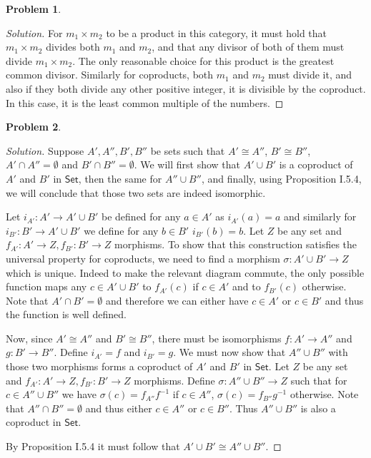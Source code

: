 \documentclass{article}
\theoremstyle{definition}
\newtheorem{problem-internal}{Problem}[subsection]
\newenvironment{problem}{
	\medskip
	\begin{problem-internal}
	}{
\end{problem-internal}
}
\newenvironment{solution}{
	\begin{proof}[Solution]
		\vspace{-8px}
		\setlength{\parskip}{4px}
		\setlength{\parindent}{0px}
	}{
\end{proof}
}
\newcommand{\Cset}{\mathsf{Set}}
\begin{document}
\begin{problem}
\end{problem}

\begin{solution}
	For $m_1 \times m_2$ to be a product in this category, it must hold that $m_1 \times m_2$ divides both $m_1$ and $m_2$, and that any divisor of both of them must divide $m_1 \times m_2$. The only reasonable choice for this product is the greatest common divisor. Similarly for coproducts, both $m_1$ and $m_2$ must divide it, and also if they both divide any other positive integer, it is divisible by the coproduct. In this case, it is the least common multiple of the numbers.
\end{solution}

\begin{problem}
\end{problem}

\begin{solution}
	Suppose $A', A'', B', B''$ be sets such that $A' \cong A''$, $B' \cong B''$, $A' \cap A'' = \emptyset$ and $B' \cap B'' = \emptyset$. We will first show that $A' \cup B'$ is a coproduct of $A'$ and $B'$ in $\Cset$, then the same for $A'' \cup B''$, and finally, using Proposition I.5.4, we will conclude that those two sets are indeed isomorphic.
	
	Let $i_{A'}: A' \to A' \cup B'$ be defined for any $a \in A'$ as $i_{A'}(a) = a$ and similarly for $i_{B'}: B' \to A' \cup B'$ we define for any $b \in B'$ $i_{B'}(b) = b$. Let $Z$ be any set and $f_{A'}: A' \to Z, f_{B'}: B' \to Z$ morphisms. To show that this construction satisfies the universal property for coproducts, we need to find a morphism $\sigma: A' \cup B' \to Z$ which is unique. Indeed to make the relevant diagram commute, the only possible function maps any $c \in A' \cup B'$ to $f_{A'}(c)$ if $c \in A'$ and to $f_{B'}(c)$ otherwise. Note that $A' \cap B' = \emptyset$ and therefore we can either have $c \in A'$ or $c \in B'$ and thus the function is well defined.
	
	Now, since $A' \cong A''$ and $B' \cong B''$, there must be isomorphisms $f : A' \to A''$ and $g: B' \to B''$. Define $i_{A'}=f$ and $i_{B'}=g$. We must now show that $A'' \cup B''$ with those two morphisms forms a coproduct of $A'$ and $B'$ in $\Cset$. Let $Z$ be any set and $f_{A'}: A' \to Z, f_{B'}: B' \to Z$ morphisms. Define $\sigma: A'' \cup B'' \to Z$ such that for $c \in A'' \cup B''$ we have $\sigma(c)=f_{A''}f^{-1}$ if $c \in A''$, $\sigma(c)=f_{B''}g^{-1}$ otherwise. Note that $A'' \cap B'' = \emptyset$ and thus either $c \in A''$ or $c \in B''$. Thus $A'' \cup B''$ is also a coproduct in $\Cset$.
	
	By Proposition I.5.4 it must follow that $A' \cup B' \cong A'' \cup B''$.
\end{solution}
\end{document}
